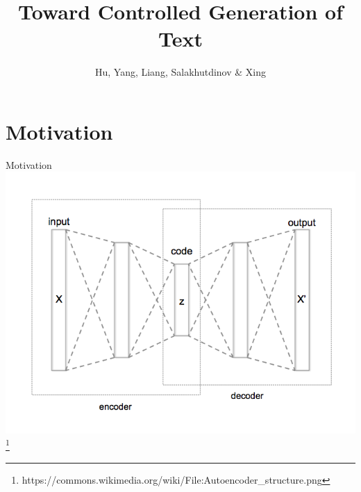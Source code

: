 \documentclass{beamer}
\title{Toward Controlled Generation of Text}
\date{}
\author{Hu, Yang, Liang, Salakhutdinov \& Xing}
\institute{ICML 2017}
\begin{document}
\maketitle

\section{Motivation}

\begin{frame}{Motivation}
  \centering
  \includegraphics[width=.9\textwidth]{images/autoencoder.png}
  {\tiny \footnote{https://commons.wikimedia.org/wiki/File:Autoencoder\_structure.png}}
\end{frame}
\end{document}

